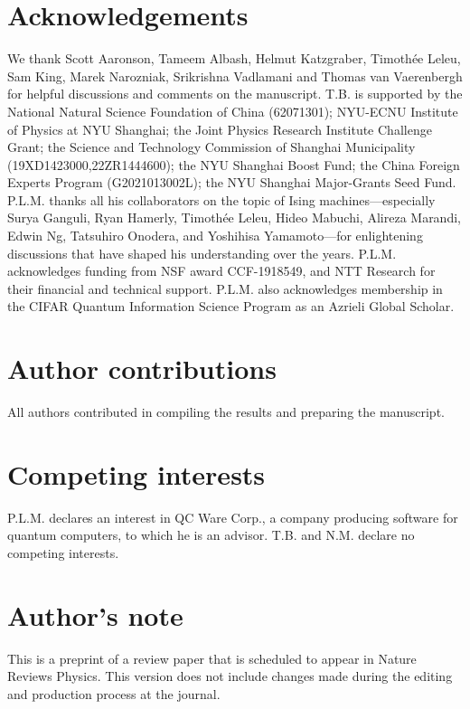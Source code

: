 \documentclass[fleqn,10pt]{wlscirep}
\begin{document}
\section*{Acknowledgements}
We thank Scott Aaronson, Tameem Albash, Helmut Katzgraber, Timoth{\'e}e Leleu, Sam King, Marek Narozniak, Srikrishna Vadlamani and Thomas van Vaerenbergh for helpful discussions and comments on the manuscript.  T.B. is supported by the National Natural Science Foundation of China (62071301); NYU-ECNU Institute of Physics at NYU Shanghai; the Joint Physics Research Institute Challenge Grant; the Science and Technology Commission of Shanghai Municipality (19XD1423000,22ZR1444600); the NYU Shanghai Boost Fund; the China Foreign Experts Program (G2021013002L); the NYU Shanghai Major-Grants Seed Fund. P.L.M. thanks all his collaborators on the topic of Ising machines---especially Surya Ganguli, Ryan Hamerly, Timothée Leleu, Hideo Mabuchi, Alireza Marandi, Edwin Ng, Tatsuhiro Onodera, and Yoshihisa Yamamoto---for enlightening discussions that have shaped his understanding over the years. P.L.M. acknowledges funding from NSF award CCF-1918549, and NTT Research for their financial and technical support. P.L.M. also acknowledges membership in the CIFAR Quantum Information Science Program as an Azrieli Global Scholar.






\section*{Author contributions}
All authors contributed in compiling the results and preparing the manuscript.  

\section*{Competing interests}
P.L.M. declares an interest in QC Ware Corp., a company producing software for quantum computers, to which he is an advisor.  T.B. and N.M. declare no competing interests. 


\section*{Author's note}
This is a preprint of a review paper that is scheduled to appear in Nature Reviews Physics. This version does not include changes made during the editing and production process at the journal.
\end{document}
